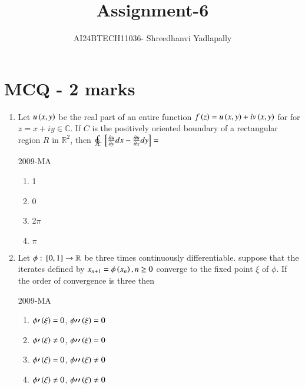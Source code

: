 \documentclass[journal,12pt,onecolumn]{IEEEtran}
\theoremstyle{remark}
\begin{document}

\vspace{3cm}

\title{Assignment-6}
\author{AI24BTECH11036- Shreedhanvi Yadlapally}
\maketitle

\bigskip
\renewcommand{\thefigure}{\theenumi}
\renewcommand{\thetable}{\theenumi}
\section{MCQ - 2 marks}
\begin{enumerate}

	\item Let $u\left(x,y\right)$ be the real part of an entire function $f\left(z\right)=u\left(x,y\right)+iv\left(x,y\right)$ for for $z=x+iy\in \mathbb{C}$. If $C$ is the positively oriented boundary of a rectangular region $R$ in $\mathbb{R}^{2}$, then $\oint_{C}{}\left[\frac{\partial u}{\partial y}dx-\frac{\partial u}{\partial x}dy\right]=$

		\hfill{2009-MA}
	\begin{multicols}{4}
	\begin{enumerate}
		\item 1
		\item 0
		\item 2$\pi$
		\item $\pi$
	\end{enumerate}
        \end{multicols}

	\item Let $\phi :{}\left[0,1\right]\to \mathbb{R}$ be three times continuously differentiable. suppose that the iterates defined by $x_{n+1}=\phi \left(x_{n}\right), n\geq 0$ converge to the fixed point $\xi$ of $\phi$. If the order of convergence is three then

		\hfill{2009-MA}
	\begin{multicols}{2}
	\begin{enumerate}
		\item $\phi \prime \left(\xi\right)=0$, $\phi \prime \prime \left(\xi\right)=0$
		\item $\phi \prime \left(\xi\right)\neq 0$, $\phi \prime \prime \left(\xi\right)=0$
		\item $\phi \prime \left(\xi\right)=0$, $\phi \prime \prime \left(\xi\right)\neq 0$ 
		\item $\phi \prime \left(\xi\right)\neq 0$, $\phi \prime \prime \left(\xi\right)\neq 0$
	\end{enumerate}
	\end{multicols}


\end{enumerate}
\end{document}
